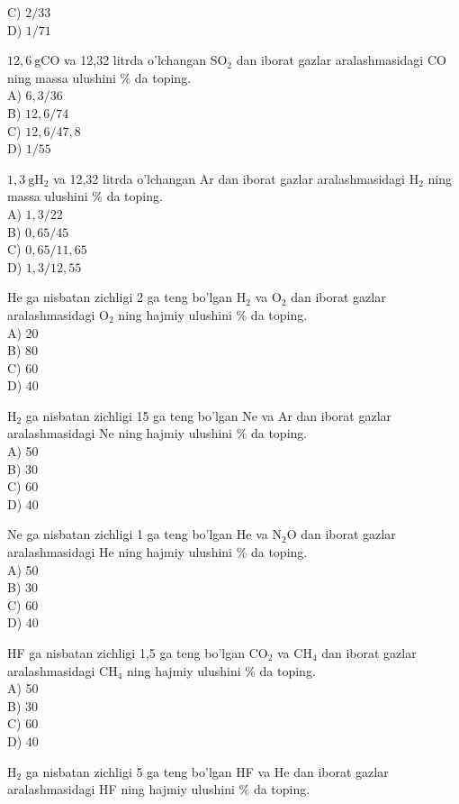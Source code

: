 C) $2 / 33$\\
D) $1 / 71$
  \item $12,6 \mathrm{~g} \mathrm{CO}$ va 12,32 litrda o'lchangan $\mathrm{SO}_{2}$ dan iborat gazlar aralashmasidagi CO ning massa ulushini \% da toping.\\
A) $6,3 / 36$\\
B) $12,6 / 74$\\
C) $12,6 / 47,8$\\
D) $1 / 55$
  \item $1,3 \mathrm{~g} \mathrm{H}_{2}$ va 12,32 litrda o'lchangan Ar dan iborat gazlar aralashmasidagi $\mathrm{H}_{2}$ ning massa ulushini \% da toping.\\
A) $1,3 / 22$\\
B) $0,65 / 45$\\
C) $0,65 / 11,65$\\
D) $1,3 / 12,55$
  \item He ga nisbatan zichligi 2 ga teng bo'lgan $\mathrm{H}_{2}$ va $\mathrm{O}_{2}$ dan iborat gazlar aralashmasidagi $\mathrm{O}_{2}$ ning hajmiy ulushini \% da toping.\\
A) 20\\
B) 80\\
C) 60\\
D) 40\\
  \item $\mathrm{H}_{2}$ ga nisbatan zichligi 15 ga teng bo'lgan Ne va Ar dan iborat gazlar aralashmasidagi Ne ning hajmiy ulushini \% da toping.\\
A) 50\\
B) 30\\
C) 60\\
D) 40
  \item Ne ga nisbatan zichligi 1 ga teng bo'lgan He va $\mathrm{N}_{2} \mathrm{O}$ dan iborat gazlar aralashmasidagi He ning hajmiy ulushini \% da toping.\\
A) 50\\
B) 30\\
C) 60\\
D) 40
  \item HF ga nisbatan zichligi 1,5 ga teng bo'lgan $\mathrm{CO}_{2}$ va $\mathrm{CH}_{4}$ dan iborat gazlar aralashmasidagi $\mathrm{CH}_{4}$ ning hajmiy ulushini \% da toping.\\
A) 50\\
B) 30\\
C) 60\\
D) 40
  \item $\mathrm{H}_{2}$ ga nisbatan zichligi 5 ga teng bo'lgan HF va He dan iborat gazlar aralashmasidagi HF ning hajmiy ulushini $\%$ da toping.\\
